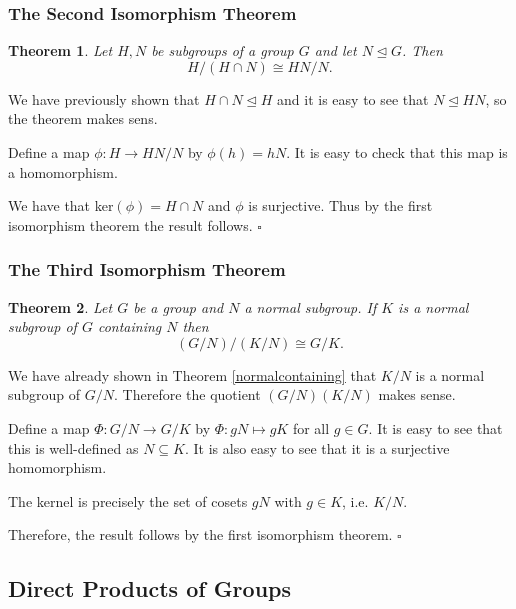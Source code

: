 \documentclass[10pt]{article}
\newtheorem{theorem}{Theorem}[section]
\newenvironment{proof}[1][Proof]{\begin{trivlist}
\item[\hskip \labelsep {\itshape #1}]}{\end{trivlist}}
\begin{document}
\subsubsection{The Second Isomorphism Theorem}

\begin{theorem}
Let $H, N$ be subgroups of a group $G$ and let $N \mathrel{\unlhd} G$. Then
$$H/(H\cap N) \cong HN/N.$$
\end{theorem}

\begin{proof}
We have previously shown that $H\cap N \mathrel{\unlhd} H$ and it is easy to see that $N \mathrel{\unlhd} HN$, so the theorem makes sens.

Define a map $\phi : H \to HN/N$ by $\phi(h) = hN$. It is easy to check that this map is a homomorphism.

We have that ker$(\phi) = H\cap N$ and $\phi$ is surjective. Thus by the first isomorphism theorem the result follows. $\square$
\end{proof}

\subsubsection{The Third Isomorphism Theorem}

\begin{theorem}
Let $G$ be a group and $N$ a normal subgroup. If $K$ is a normal subgroup of $G$ containing $N$ then
$$(G/N)/(K/N) \cong G/K.$$
\end{theorem}

\begin{proof}
We have already shown in Theorem \ref{normalcontaining} that $K/N$ is a normal subgroup of $G/N$. Therefore the quotient $(G/N)(K/N)$ makes sense.

Define a map $\Phi : G/N \to G/K$ by $\Phi : gN \mapsto gK$ for all $g \in G$. It is easy to see that this is well-defined as $N \subseteq K$. It is also easy to see that it is a surjective homomorphism.

The kernel is precisely the set of cosets $gN$ with $g \in K$, i.e. $K/N$. 

Therefore, the result follows by the first isomorphism theorem. $\square$
\end{proof}

\subsection{Direct Products of Groups}
\end{document}
